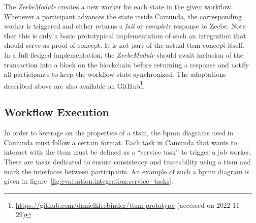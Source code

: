 The \textit{ZeebeModule} creates a new worker for each state in the given workflow. Whenever a participant advances the state inside Camunda, the corresponding worker is triggered and either returns a \textit{fail} or \textit{complete} response to Zeebe. Note that this is only a basic prototypical implementation of such an integration that should serve as proof of concept. It is not part of the actual \gls{ttsm} concept itself. In a full-fledged implementation, the \textit{ZeebeModule} should await inclusion of the transaction into a block on the blockchain before returning a response and notify all participants to keep the workflow state synchronized. The adaptations described above are also available on GitHub\footnote{\url{https://github.com/danielkleebinder/ttsm-prototype} (accessed on 2022-11-29)}.


\subsection{Workflow Execution}
\label{sec:evaluation:integration:execution}
In order to leverage on the properties of a \gls{ttsm}, the \gls{bpmn} diagrams used in Camunda must follow a certain format. Each task in Camunda that wants to interact with the \gls{ttsm} must be defined as a ``service task'' to trigger a job worker. These are tasks dedicated to ensure consistency and traceability using a \gls{ttsm} and mark the interfaces between participants. An example of such a \gls{bpmn} diagram is given in figure~\ref{fig:evaluation:integration:service_tasks}.

